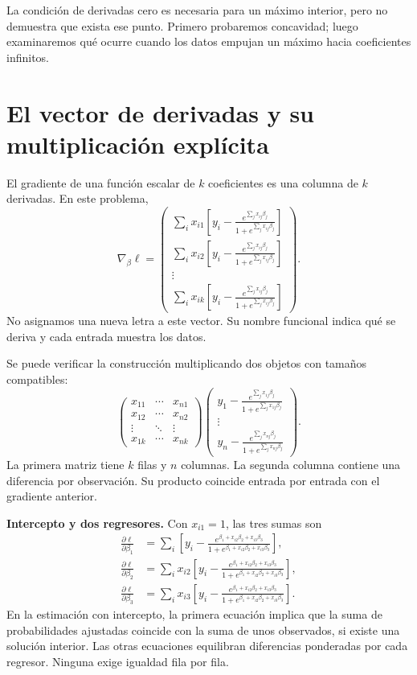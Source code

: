 \documentclass[11pt,a4paper]{article}
\begin{document}
La condición de derivadas cero es necesaria para un máximo interior,
pero no demuestra que exista ese punto.
Primero probaremos concavidad; luego examinaremos qué ocurre cuando
los datos empujan un máximo hacia coeficientes infinitos.

\clearpage
\section{El vector de derivadas y su multiplicación explícita}\label{logit16}
El gradiente de una función escalar de $k$ coeficientes es una columna
de $k$ derivadas. En este problema,
\[
\nabla_\beta\ell=
\begin{pmatrix}
\sum_i x_{i1}\left[y_i-\frac{e^{\sum_jx_{ij}\beta_j}}{1+e^{\sum_jx_{ij}\beta_j}}\right]\\
\sum_i x_{i2}\left[y_i-\frac{e^{\sum_jx_{ij}\beta_j}}{1+e^{\sum_jx_{ij}\beta_j}}\right]\\
\vdots\\
\sum_i x_{ik}\left[y_i-\frac{e^{\sum_jx_{ij}\beta_j}}{1+e^{\sum_jx_{ij}\beta_j}}\right]
\end{pmatrix}.
\]
No asignamos una nueva letra a este vector.
Su nombre funcional indica qué se deriva y cada entrada muestra los datos.

Se puede verificar la construcción multiplicando dos objetos con tamaños
compatibles:
\[
\begin{pmatrix}
x_{11}&\cdots&x_{n1}\\x_{12}&\cdots&x_{n2}\\
\vdots&\ddots&\vdots\\x_{1k}&\cdots&x_{nk}
\end{pmatrix}
\begin{pmatrix}
y_1-\frac{e^{\sum_jx_{1j}\beta_j}}{1+e^{\sum_jx_{1j}\beta_j}}\\
\vdots\\
y_n-\frac{e^{\sum_jx_{nj}\beta_j}}{1+e^{\sum_jx_{nj}\beta_j}}
\end{pmatrix}.
\]
La primera matriz tiene $k$ filas y $n$ columnas.
La segunda columna contiene una diferencia por observación.
Su producto coincide entrada por entrada con el gradiente anterior.

\textbf{Intercepto y dos regresores.}
Con $x_{i1}=1$, las tres sumas son
\[
\begin{aligned}
\frac{\partial\ell}{\partial\beta_1}
&=\sum_i\left[y_i-\frac{e^{\beta_1+x_{i2}\beta_2+x_{i3}\beta_3}}
{1+e^{\beta_1+x_{i2}\beta_2+x_{i3}\beta_3}}\right],\\
\frac{\partial\ell}{\partial\beta_2}
&=\sum_i x_{i2}\left[y_i-\frac{e^{\beta_1+x_{i2}\beta_2+x_{i3}\beta_3}}
{1+e^{\beta_1+x_{i2}\beta_2+x_{i3}\beta_3}}\right],\\
\frac{\partial\ell}{\partial\beta_3}
&=\sum_i x_{i3}\left[y_i-\frac{e^{\beta_1+x_{i2}\beta_2+x_{i3}\beta_3}}
{1+e^{\beta_1+x_{i2}\beta_2+x_{i3}\beta_3}}\right].
\end{aligned}
\]
En la estimación con intercepto, la primera ecuación implica
que la suma de probabilidades ajustadas coincide con la suma de unos
observados, si existe una solución interior.
Las otras ecuaciones equilibran diferencias ponderadas por cada regresor.
Ninguna exige igualdad fila por fila.
\end{document}
